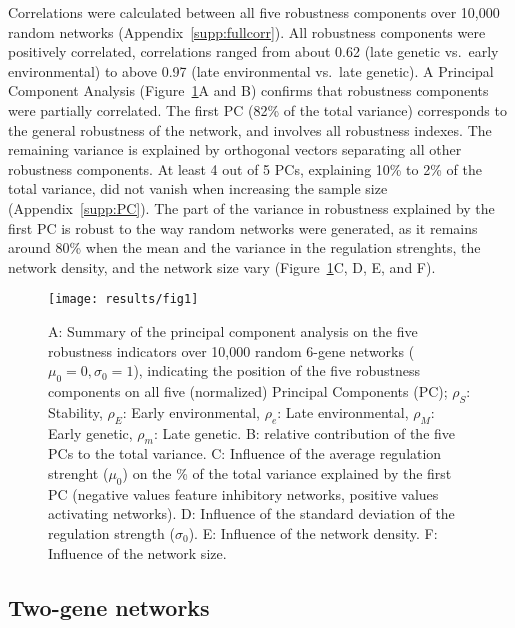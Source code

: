 \documentclass[10pt,a4paper]{article}
\newcommand{\stability}{{\rho_S}}
\newcommand{\earlyenv}{{\rho_E}}
\newcommand{\lateenv}{{\rho_e}}
\newcommand{\earlymut}{{\rho_M}}
\newcommand{\latemut}{{\rho_m}}
\newcommand{\SupMat}{Appendix~}
\begin{document}
Correlations were calculated between all five robustness components over 10,000 random networks (\SupMat \ref{supp:fullcorr}). All robustness components were positively correlated, correlations ranged from about 0.62 (late genetic vs.\ early environmental) to above 0.97 (late environmental vs.\ late genetic). A Principal Component Analysis (Figure~\ref{fig:pca}A and B) confirms that robustness components were partially correlated. The first PC (82\% of the total variance) corresponds to the general robustness of the network, and involves all robustness indexes. The remaining variance is explained by orthogonal vectors separating all other robustness components. At least 4 out of 5 PCs, explaining 10\% to 2\% of the total variance, did not vanish when increasing the sample size (\SupMat \ref{supp:PC}). The part of the variance in robustness explained by the first PC is robust to the way random networks were generated, as it remains around 80\%  when the mean and the variance in the regulation strenghts, the network density, and the network size vary (Figure~\ref{fig:pca}C, D, E, and F). 

\begin{figure}[t]
\begin{adjustwidth}{-1.5in}{0in}
\texttt{[image: results/fig1]}
\caption{\color{Gray} \label{fig:pca} A: Summary of the principal component analysis on the five robustness indicators over 10,000 random 6-gene networks ($\mu_0=0, \sigma_0=1$), indicating the position of the five robustness components on all five (normalized) Principal Components (PC); $\stability$: Stability, $\earlyenv$: Early environmental, $\lateenv$: Late environmental, $\earlymut$: Early genetic, $\latemut$: Late genetic. B: relative contribution of the five PCs to the total variance. C: Influence of the average regulation strenght ($\mu_0$) on the \% of the total variance explained by the first PC (negative values feature inhibitory networks, positive values activating networks). D: Influence of the standard deviation of the regulation strength ($\sigma_0$). E: Influence of the network density. F: Influence of the network size. }
\end{adjustwidth}
\end{figure}

\subsection{Two-gene networks}
\end{document}

